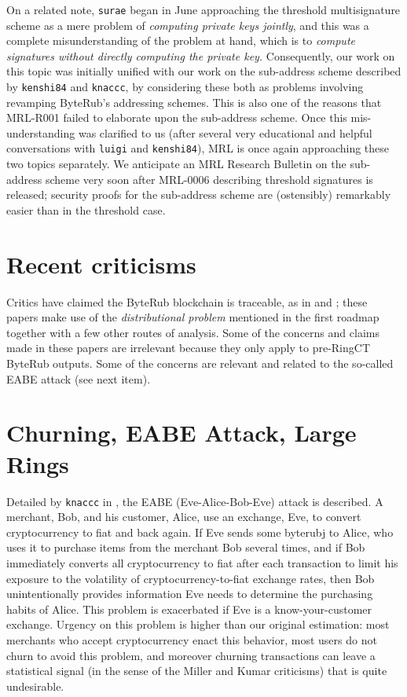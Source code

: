 \documentclass[12pt,english]{mrl}
\theoremstyle{definition}
\numberwithin{equation}{section}
\numberwithin{figure}{section}
\numberwithin{equation}{section}
\numberwithin{equation}{section}
\numberwithin{figure}{section}
\begin{document}
    
On a related note, \texttt{surae} began in June approaching the threshold multisignature scheme as a mere problem of \textit{computing private keys jointly}, and this was a complete misunderstanding of the problem at hand, which is to \textit{compute signatures without directly computing the private key.} Consequently, our work on this topic was initially unified with our work on the sub-address scheme described by \texttt{kenshi84} and \texttt{knaccc}, by considering these both as problems involving revamping ByteRub's addressing schemes. This is also one of the reasons that MRL-R001 failed to elaborate upon the sub-address scheme. Once this mis-understanding was clarified to us (after several very educational and helpful conversations with \texttt{luigi} and \texttt{kenshi84}), MRL is once again approaching these two topics separately. We anticipate an MRL Research Bulletin on the sub-address scheme very soon after MRL-0006 describing threshold signatures is released; security proofs for the sub-address scheme are (ostensibly) remarkably easier than in the threshold case.
    
\section{Recent criticisms} 

Critics have claimed the ByteRub blockchain is traceable, as in \cite{miller2017empirical} and \cite{kumar2017traceability}; these papers make use of the \emph{distributional problem} mentioned in the first roadmap together with a few other routes of analysis. Some of the concerns and claims made in these papers are irrelevant because they only apply to pre-RingCT ByteRub outputs. Some of the concerns are relevant and related to the so-called EABE attack (see next item).
    
    
    
\section{Churning, EABE Attack, Large Rings}

Detailed by \texttt{knaccc} in \cite{knaccc2017}, the EABE (Eve-Alice-Bob-Eve) attack is described. A merchant, Bob, and his customer, Alice, use an exchange, Eve, to convert cryptocurrency to fiat and back again. If Eve sends some byterubj to Alice, who uses it to purchase items from the merchant Bob several times, and if Bob immediately converts all cryptocurrency to fiat after each transaction to limit his exposure to the volatility of cryptocurrency-to-fiat exchange rates, then Bob unintentionally provides information Eve needs to determine the purchasing habits of Alice. This problem is exacerbated if Eve is a know-your-customer exchange. Urgency on this problem is higher than our original estimation: most merchants who accept cryptocurrency enact this behavior, most users do not churn to avoid this problem, and moreover churning transactions can leave a statistical signal (in the sense of the Miller and Kumar criticisms) that is quite undesirable.  
    
\end{document}
